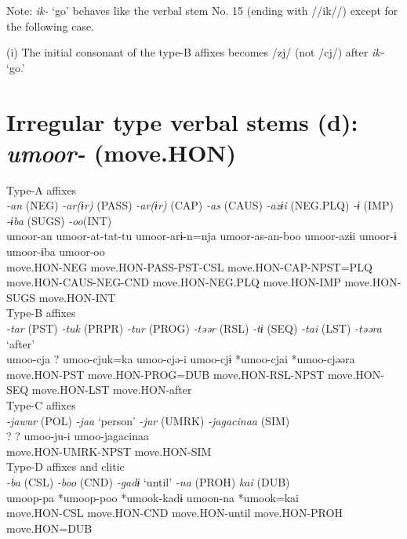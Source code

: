 Note: \textit{ik-} ‘go’ behaves like the verbal stem No. 15 (ending with //ik//) except for the following case.

(i)  The initial consonant of the type-B affixes becomes /zj/ (not /cj/) after \textit{ik-} ‘go.’

\section{Irregular type verbal stems (d): \textit{umoor-} (move.HON)}

\ea Type-A affixes\\
\glll \textit{-an} (NEG)  \textit{-ar(ɨr)} (PASS)  \textit{-ar(ɨr)} (CAP)  \textit{-as} (CAUS)  \textit{-azɨi} (NEG.PLQ)  \textit{-ɨ} (IMP)  \textit{-ɨba} (SUGS)  \textit{-oo}(INT)\\
umoor-an  umoor-at-tat-tu  umoor-arɨ-n=nja  umoor-as-an-boo  umoor-azɨi  umoor-ɨ  umoor-ɨba  umoor-oo\\
move.HON-NEG  move.HON-PASS-PST-CSL  move.HON-CAP-NPST=PLQ  move.HON-CAUS-NEG-CND  move.HON-NEG.PLQ  move.HON-IMP  move.HON-SUGS  move.HON-INT\\


\ex Type-B affixes\\
\glll \textit{-tar} (PST)  \textit{-tuk} (PRPR)  \textit{-tur} (PROG)  \textit{-təər} (RSL)  \textit{-tɨ} (SEQ)  \textit{-tai} (LST)  \textit{-təəra} ‘after’\\
umoo-cja  ?  umoo-cjuk=ka  umoo-cjə-i  umoo-cjɨ  *umoo-cjai  *umoo-cjəəra\\
move.HON-PST    move.HON-PROG=DUB  move.HON-RSL-NPST  move.HON-SEQ  move.HON-LST  move.HON-after\\


\ex Type-C affixes\\
\glll \textit{-jawur} (POL)  \textit{-jaa} ‘person’  \textit{-jur} (UMRK)  \textit{-jagacinaa} (SIM)\\
?  ?  umoo-ju-i  umoo-jagacinaa\\
    move.HON-UMRK-NPST  move.HON-SIM\\


\ex Type-D affixes and clitic\\
\glll \textit{-ba} (CSL)  \textit{-boo} (CND)  \textit{-gadɨ} ‘until’  \textit{-na} (PROH)  \textit{kai} (DUB)\\
umoop-pa  *umoop-poo  *umook-kadɨ  umoon-na  *umook=kai\\
move.HON-CSL  move.HON-CND  move.HON-until  move.HON-PROH  move.HON=DUB\\
\z


